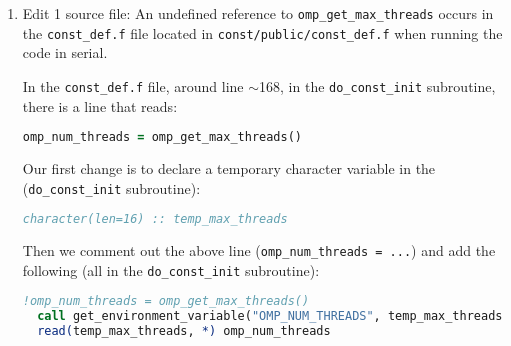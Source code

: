 \begin{enumerate}
%
%
%
%
%
%
%

%
\item Edit 1 source file: An undefined reference to 
{\tt omp\_get\_max\_threads} occurs in the {\tt const\_def.f} file located in 
{\tt const/public/const\_def.f} when running the code in serial.

In the {\tt const\_def.f} file, around line $\sim$168, in the 
{\tt do\_const\_init} subroutine, there is a line that reads:
\begin{lstlisting}[language=fortran,mathescape=false]
  omp_num_threads = omp_get_max_threads()
\end{lstlisting}
Our first change is to declare a temporary character variable in the 
({\tt do\_const\_init} subroutine):
\begin{lstlisting}[language=fortran,mathescape=false]
  character(len=16) :: temp_max_threads
\end{lstlisting}
Then we comment out the above line ({\tt omp\_num\_threads = ...}) and add the 
following (all in the {\tt do\_const\_init} subroutine):
\begin{lstlisting}[language=fortran,mathescape=false]
  !omp_num_threads = omp_get_max_threads()
  call get_environment_variable("OMP_NUM_THREADS", temp_max_threads)
  read(temp_max_threads, *) omp_num_threads
\end{lstlisting}

\end{enumerate}

